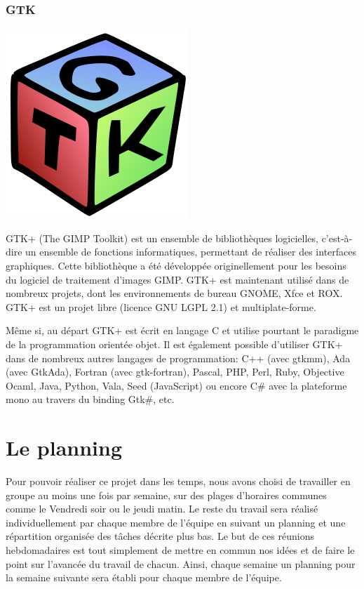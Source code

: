 \documentclass[12pt,a4paper]{report}
\begin{document}
	\subsection{GTK}

\begin{center}
\includegraphics[scale =0.5]{GTK.jpg}
\end{center}

GTK+ (The GIMP Toolkit) est un ensemble de bibliothèques logicielles, c'est-à-dire un ensemble de fonctions informatiques, permettant de réaliser des interfaces graphiques. Cette bibliothèque a été développée originellement pour les besoins du logiciel de traitement d'images GIMP. GTK+ est maintenant utilisé dans de nombreux projets, dont les environnements de bureau GNOME, Xfce et ROX.
GTK+ est un projet libre (licence GNU LGPL 2.1) et multiplate-forme.

Même si, au départ GTK+ est écrit en langage C et utilise pourtant le paradigme de la programmation orientée objet. Il est également possible d'utiliser GTK+ dans de nombreux autres langages de programmation: C++ (avec gtkmm), Ada (avec GtkAda), Fortran (avec gtk-fortran), Pascal, PHP, Perl, Ruby, Objective Ocaml, Java, Python, Vala, Seed (JavaScript) ou encore C\# avec la plateforme mono au travers du binding Gtk\#, etc.

\chapter{Le planning}
Pour pouvoir réaliser ce projet dans les temps, nous avons choisi de travailler en groupe au moins une fois par semaine, sur des plages d'horaires communes comme le Vendredi soir ou le jeudi matin. Le reste du travail sera réalisé individuellement par chaque membre de l'équipe en suivant un planning et une répartition organisée des tâches décrite plus bas. Le but de ces réunions hebdomadaires est tout simplement de mettre en commun nos idées et de faire le point sur l'avancée du travail de chacun. Ainsi, chaque semaine un planning pour la semaine suivante sera établi pour chaque membre de l'équipe.
\end{document}
